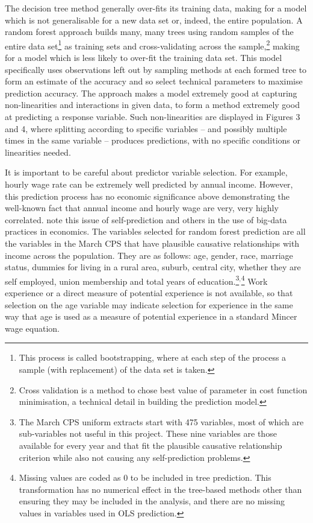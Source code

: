 \documentclass[notitlepage,12pt]{article}
\begin{document}
The decision tree method generally over-fits its training data, making for a model which is not generalisable for a new data set or, indeed, the entire population.  A random forest approach builds many, many trees using random samples of the entire data set\footnote{This process is called bootstrapping, where at each step of the process a sample (with replacement) of the data set is taken.} as training sets and cross-validating across the sample,\footnote{Cross validation is a method to chose best value of parameter in cost function minimisation, a technical detail in building the prediction model.} making for a model which is less likely to over-fit the training data set.  This model specifically uses observations left out by sampling methods at each formed tree to form an estimate of the accuracy and so select technical parameters to maximise prediction accuracy.  The approach makes a model extremely good at capturing non-linearities and interactions in given data, to form a method extremely good at predicting a response variable.  Such non-linearities are displayed in Figures 3 and 4, where splitting according to specific variables -- and possibly multiple times in the same variable -- produces predictions, with no specific conditions or linearities needed.

It is important to be careful about predictor variable selection.  For example, hourly wage rate can be extremely well predicted by annual income.  However, this prediction process has no economic significance above demonstrating the well-known fact that annual income and hourly wage are very, very highly correlated.  \cite{mullainathan2017machine} note this issue of self-prediction and others in the use of big-data practices in economics.  The variables selected for random forest prediction are all the variables in the March CPS that have plausible causative relationships with income across the population.  They are as follows: age, gender, race, marriage status, dummies for living in a rural area, suburb, central city, whether they are self employed, union membership and total years of education.\footnote{The March CPS uniform extracts start with 475 variables, most of which are sub-variables not useful in this project.  These nine variables are those available for every year and that fit the plausible causative relationship criterion while also not causing any self-prediction problems.}$^{,}$\footnote{Missing values are coded as 0 to be included in tree prediction.  This transformation has no numerical effect in the tree-based methods other than ensuring they may be included in the analysis, and there are no missing values in variables used in OLS prediction.}  Work experience or a direct measure of potential experience is not available, so that selection on the age variable may indicate selection for experience in the same way that age is used as a measure of potential experience in a standard Mincer wage equation.
\end{document}
